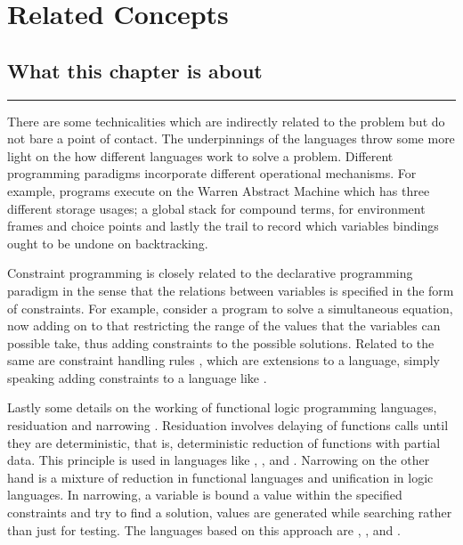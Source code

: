 \documentclass[proposal.tex]{subfiles}
\begin{document}
\chapter{Related Concepts}\label{chap:relatedWork}


\section{What this chapter is about}

\noindent\rule{\textwidth}{0.5pt}


There are some technicalities which are indirectly related to the problem but do not bare a point of contact.
The underpinnings of the languages throw some more light on the how different languages work to solve a problem.
Different programming paradigms incorporate different operational mechanisms.
For example,  programs execute on the Warren Abstract Machine \cite{ait1999warren} which has three
different storage usages; a global stack for compound terms, for environment frames and choice points and lastly
the trail to record which variables bindings ought to be undone on backtracking.

Constraint programming \cite{website:constraintprogwiki} is closely related to the declarative programming paradigm
in the sense that the relations between variables is specified in the form of constraints.
For example, consider a program to solve a simultaneous equation, now adding on to that restricting the range of
the values that the variables can possible take, thus adding constraints to the possible solutions.
Related to the same are constraint handling rules \cite{website:chrwiki}, which are extensions to a language,
simply speaking adding constraints to a language like .

Lastly some details on the working of functional logic programming languages, residuation and narrowing
\cite{hanus1995curry,webiste:wikicurry}.
Residuation involves delaying of functions calls until they are deterministic, that is, deterministic reduction of
functions with partial data.
This principle is used in languages like  \cite{lloyd1999programming:escher}, 
\cite{website:life},  \cite{website:nue-prolog} and  \cite{website:oz-mozart}.
Narrowing on the other hand is a mixture of reduction in functional languages and unification in logic languages.
In narrowing, a variable is bound a value within the specified constraints and try to find a solution, values are
generated while searching rather than just for testing.
The languages based on this approach are  \cite{website:alf},  \cite{website:babel},
 \cite{bert1987lpg} and  \cite{website:curry}.
\end{document}
